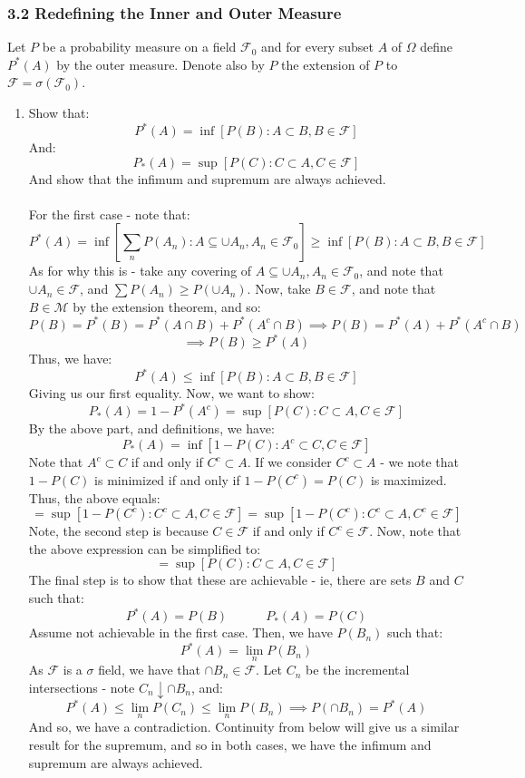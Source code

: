 \documentclass[12pt,a4paper]{article}
\newcommand{\1}[1]{\mathbbm{1}\left\{ #1 \right\}}
\newcommand{\fcal}{\mathcal{F}}
\newcommand{\mcal}{\mathcal{M}}
\begin{document}
\subsubsection{3.2 Redefining the Inner and Outer Measure} Let $P$ be a probability measure on a field $\fcal_0$ and for every subset $A$ of $\Omega$ define $P^*(A)$ by the outer measure. Denote also by $P$ the extension of $P$ to $\fcal = \sigma(\fcal_0)$.
\begin{enumerate}
	\item Show that:
	$$
		P^*(A) = \inf\left[P(B) : A \subset B, B \in \fcal\right]
	$$
	And:
	$$
		P_*(A) = \sup\left[P(C) : C \subset A, C \in \fcal\right]
	$$
	And show that the infimum and supremum are always achieved.
	\\\\
	For the first case - note that:
	$$
		P^*(A) = \inf\left[\sum_n P(A_n) : A \subseteq \cup A_n, A_n \in \fcal_0\right] \geq 
		\inf\left[P(B) : A \subset B, B \in \fcal\right]
	$$
	As for why this is - take any covering of $A \subseteq \cup A_n, A_n \in \fcal_0$, and note that $\cup A_n \in \fcal$, and $\sum P(A_n) \geq P(\cup A_n)$. Now, take $B \in \fcal$, and note that $B \in \mcal$ by the extension theorem, and so:
	$$
		P(B) = P^*(B) = P^*(A \cap B) + P^*(A^c \cap B) \implies
		P(B) = P^*(A) + P^*(A^c \cap B)
	$$
	$$
		\implies P(B) \geq P^*(A)
	$$
	Thus, we have:
	$$
		P^*(A) \leq \inf\left[P(B) : A \subset B, B \in \fcal\right]
	$$
	Giving us our first equality. Now, we want to show:
	$$
		P_*(A) = 1 - P^*(A^c) = \sup\left[P(C) : C \subset A, C \in \fcal\right]
	$$
	By the above part, and definitions, we have:
	$$
		P_*(A) = \inf\left[1 - P(C) : A^c \subset C, C \in \fcal\right]
	$$
	Note that $A^c \subset C$ if and only if $C^c \subset A$. If we consider $C^c \subset A$ - we note that $1 - P(C)$ is minimized if and only if $1 - P(C^c) = P(C)$ is maximized. Thus, the above equals:
	$$
		= \sup\left[1 - P(C^c) : C^c \subset A, C \in \fcal\right] =
		\sup\left[1 - P(C^c) : C^c \subset A, C^c \in \fcal\right]
	$$
	Note, the second step is because $C \in \fcal$ if and only if $C^c \in \fcal$. Now, note that the above expression can be simplified to:
	$$
		= \sup\left[P(C) : C \subset A, C \in \fcal\right]
	$$
	The final step is to show that these are achievable - ie, there are sets $B$ and $C$ such that:
	$$
		P^*(A) = P(B) \quad\quad\quad P_*(A) = P(C)
	$$
	Assume not achievable in the first case. Then, we have $P(B_n)$ such that:
	$$
		P^*(A) = \lim_n P(B_n)
	$$
	As $\fcal$ is a $\sigma$ field, we have that $\cap B_n \in \fcal$. Let $C_n$ be the incremental intersections - note $C_n \downarrow \cap B_n$, and:
	$$
		P^*(A) \leq \lim_n P(C_n) \leq \lim_n P(B_n) \implies
		P(\cap B_n) = P^*(A)
	$$
	And so, we have a contradiction. Continuity from below will give us a similar result for the supremum, and so in both cases, we have the infimum and supremum are always achieved.
	

\end{enumerate}
\end{document}
